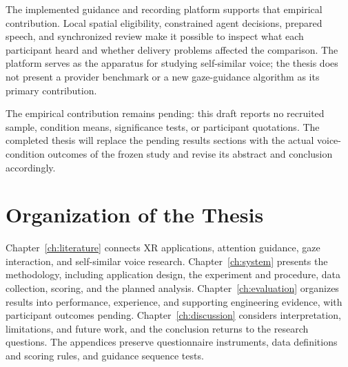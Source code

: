 The implemented guidance and recording platform supports that empirical contribution. Local spatial eligibility, constrained agent decisions, prepared speech, and synchronized review make it possible to inspect what each participant heard and whether delivery problems affected the comparison. The platform serves as the apparatus for studying self-similar voice; the thesis does not present a provider benchmark or a new gaze-guidance algorithm as its primary contribution.

The empirical contribution remains pending: this draft reports no recruited sample, condition means, significance tests, or participant quotations. The completed thesis will replace the pending results sections with the actual voice-condition outcomes of the frozen study and revise its abstract and conclusion accordingly.

\section{Organization of the Thesis}
Chapter~\ref{ch:literature} connects XR applications, attention guidance, gaze interaction, and self-similar voice research. Chapter~\ref{ch:system} presents the methodology, including application design, the experiment and procedure, data collection, scoring, and the planned analysis. Chapter~\ref{ch:evaluation} organizes results into performance, experience, and supporting engineering evidence, with participant outcomes pending. Chapter~\ref{ch:discussion} considers interpretation, limitations, and future work, and the conclusion returns to the research questions. The appendices preserve questionnaire instruments, data definitions and scoring rules, and guidance sequence tests.
